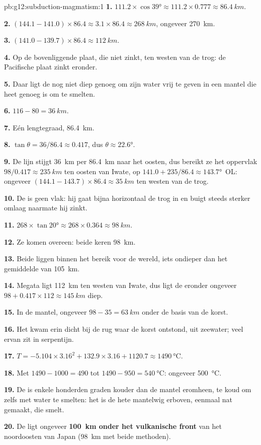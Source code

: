 \begin{solution}{pb:g12:subduction-magmatism:1}
\textbf{1.} $111.2 \times \cos\ang{39} \approx 111.2 \times 0.777 \approx
\qty{86.4}{km}$.

\textbf{2.} $(144.1 - 141.0) \times 86.4 \approx 3.1 \times 86.4 \approx
\qty{268}{km}$, ongeveer \qty{270}{km}.

\textbf{3.} $(141.0 - 139.7) \times 86.4 \approx \qty{112}{km}$.

\textbf{4.} Op de bovenliggende plaat, die niet zinkt, ten westen van de
trog: de Pacifische plaat zinkt eronder.

\textbf{5.} Daar ligt de  nog niet diep genoeg om zijn water vrij te geven in
een mantel die heet genoeg is om te smelten.

\textbf{6.} $116 - 80 = \qty{36}{km}$.

\textbf{7.} Eén lengtegraad, \qty{86.4}{km}.

\textbf{8.} $\tan\theta = 36/86.4 \approx 0.417$, dus $\theta \approx
\ang{22.6}$.

\textbf{9.} De lijn stijgt \qty{36}{km} per \qty{86.4}{km} naar het oosten, dus
bereikt ze het oppervlak $98/0.417 \approx \qty{235}{km}$ ten oosten van Iwate, op
$141.0 + 235/86.4 \approx \ang{143.7}$~OL: ongeveer $(144.1 - 143.7) \times 86.4
\approx \qty{35}{km}$ ten westen van de trog.

\textbf{10.} De  is geen vlak: hij gaat bijna horizontaal de trog in
en buigt steeds sterker omlaag naarmate hij zinkt.

\textbf{11.} $268 \times \tan\ang{20} \approx 268 \times 0.364 \approx
\qty{98}{km}$.

\textbf{12.} Ze komen overeen: beide keren \qty{98}{km}.

\textbf{13.} Beide liggen binnen het bereik voor de wereld, iets ondieper dan het
gemiddelde van \qty{105}{km}.

\textbf{14.} Megata ligt \qty{112}{km} ten westen van Iwate, dus ligt de  eronder
ongeveer $98 + 0.417 \times 112 \approx \qty{145}{km}$ diep.

\textbf{15.} In de mantel, ongeveer $98 - 35 = \qty{63}{km}$ onder de basis van
de korst.

\textbf{16.} Het kwam erin dicht bij de rug waar de korst ontstond, uit
zeewater; veel ervan zit in serpentijn.

\textbf{17.} $T = -5.104 \times 3.16^2 + 132.9 \times 3.16 + 1120.7 \approx
\qty{1490}{\celsius}$.

\textbf{18.} Met $1490 - 1000 = 490$ tot $1490 - 950 = \qty{540}{\celsius}$:
ongeveer \qty{500}{\celsius}.

\textbf{19.} De  is enkele honderden graden kouder dan de mantel
eromheen, te koud om zelfs met water te smelten: het is de hete mantelwig erboven,
eenmaal nat gemaakt, die smelt.

\textbf{20.} De  ligt ongeveer \textbf{\qty{100}{km} onder het vulkanische
front} van het noordoosten van Japan (\qty{98}{km} met beide methoden).
\end{solution}

